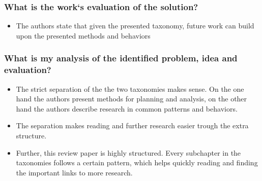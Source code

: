 \documentclass{article}
\begin{document}
\subsubsection*{What is the work`s evaluation of the solution?}
\begin{itemize}
    \item The authors state that given the presented taxonomy, future work can build upon the presented methods and behaviors
\end{itemize}
\subsubsection*{What is my analysis of the identified problem, idea and evaluation?}
\begin{itemize}
    \item The strict separation of the the two taxonomies makes sense. On the one hand the authors present methods for planning and analysis, on the other hand the authors describe research in common patterns and behaviors.
    \item The separation makes reading and further research easier trough the extra structure.
    \item Further, this review paper is highly structured. Every subchapter in the taxonomies follows a certain pattern, which helps quickly reading and finding the important links to more research. 
\end{itemize}
\end{document}
